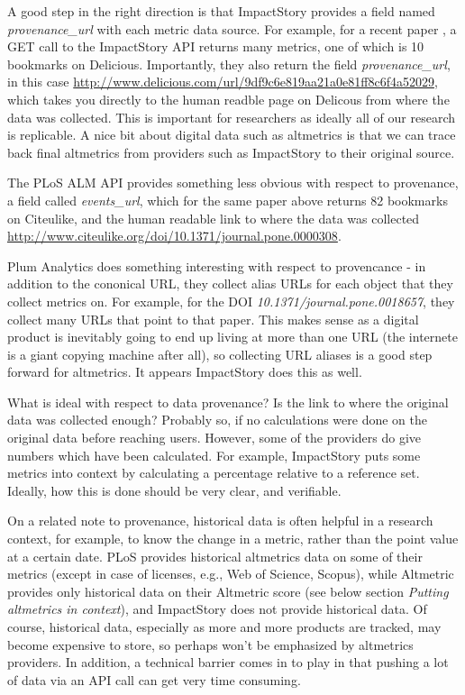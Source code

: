 \documentclass[letterpaper,superscriptaddress,showkeys,longbibliography]{revtex4-1}\usepackage{graphicx, color}
\begin{document}
A good step in the right direction is that ImpactStory provides a field named \emph{provenance\_url} with each metric data source. For example, for a recent paper \cite{piwowar2007}, a GET call to the ImpactStory API returns many metrics, one of which is 10 bookmarks on Delicious. Importantly, they also return the field \emph{provenance\_url}, in this case \url{http://www.delicious.com/url/9df9c6e819aa21a0e81ff8c6f4a52029}, which takes you directly to the human readble page on Delicous from where the data was collected. This is important for researchers as ideally all of our research is replicable. A nice bit about digital data such as altmetrics is that we can trace back final altmetrics from providers such as ImpactStory to their original source.

The PLoS ALM API provides something less obvious with respect to provenance, a field called \emph{events\_url}, which for the same paper above \cite{piwowar2007} returns 82 bookmarks on Citeulike, and the human readable link to where the data was collected \url{http://www.citeulike.org/doi/10.1371/journal.pone.0000308}. 

Plum Analytics does something interesting with respect to provencance - in addition to the cononical URL, they collect alias URLs for each object that they collect metrics on. For example, for the DOI \emph{10.1371/journal.pone.0018657}, they collect many URLs that point to that paper. This makes sense as a digital product is inevitably going to end up living at more than one URL (the internete is a giant copying machine after all), so collecting URL aliases is a good step forward for altmetrics. It appears ImpactStory does this as well.

What is ideal with respect to data provenance? Is the link to where the original data was collected enough? Probably so, if no calculations were done on the original data before reaching users. However, some of the providers do give numbers which have been calculated. For example, ImpactStory puts some metrics into context by calculating a percentage relative to a reference set. Ideally, how this is done should be very clear, and verifiable. 

On a related note to provenance, historical data is often helpful in a research context, for example, to know the change in a metric, rather than the point value at a certain date. PLoS provides historical altmetrics data on some of their metrics (except in case of licenses, e.g., Web of Science, Scopus), while Altmetric provides only historical data on their Altmetric score (see below section \emph{Putting altmetrics in context}), and ImpactStory does not provide historical data. Of course, historical data, especially as more and more products are tracked, may become expensive to store, so perhaps won't be emphasized by altmetrics providers. In addition, a technical barrier comes in to play in that pushing a lot of data via an API call can get very time consuming. 
\end{document}
